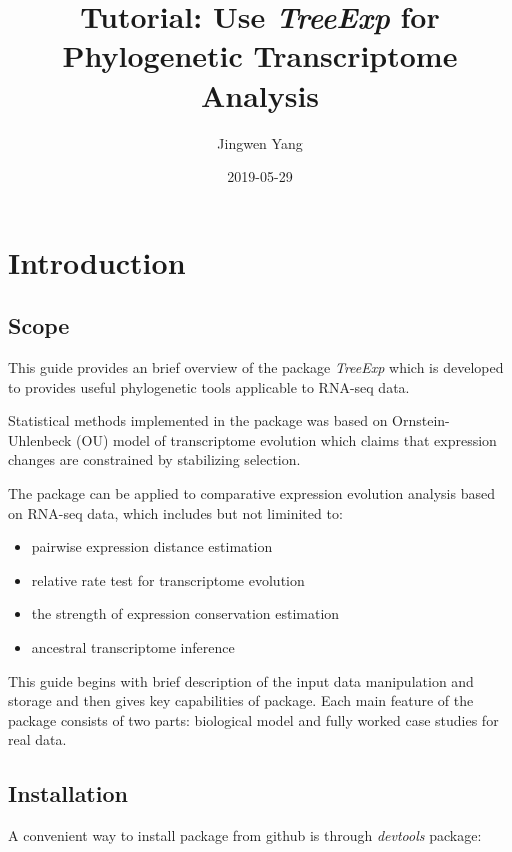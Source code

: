 \documentclass[]{book}
\title{Tutorial: Use \emph{TreeExp} for Phylogenetic Transcriptome Analysis}
\author{Jingwen Yang}
\date{2019-05-29}
\providecommand{\tightlist}{%
  \setlength{\itemsep}{0pt}\setlength{\parskip}{0pt}}
\begin{document}
\maketitle

{
\setcounter{tocdepth}{1}
\tableofcontents
}
\hypertarget{introduction}{%
\chapter{Introduction}\label{introduction}}

\hypertarget{scope}{%
\section{Scope}\label{scope}}

This guide provides an brief overview of the package \emph{TreeExp} which is developed to provides useful phylogenetic tools applicable to RNA-seq data.

Statistical methods implemented in the package was based on Ornstein-Uhlenbeck (OU) model of transcriptome evolution which claims that expression changes are constrained by stabilizing selection.

The package can be applied to comparative expression evolution analysis based on RNA-seq data, which includes but not liminited to:

\begin{itemize}
\tightlist
\item
  pairwise expression distance estimation
\item
  relative rate test for transcriptome evolution
\item
  the strength of expression conservation estimation
\item
  ancestral transcriptome inference
\end{itemize}

This guide begins with brief description of the input data manipulation and storage and then gives key capabilities of package. Each main feature of the package consists of two parts: biological model and fully worked case studies for real data.

\newpage

\hypertarget{installation}{%
\section{Installation}\label{installation}}

A convenient way to install package from github is through \emph{devtools} package:
\end{document}
